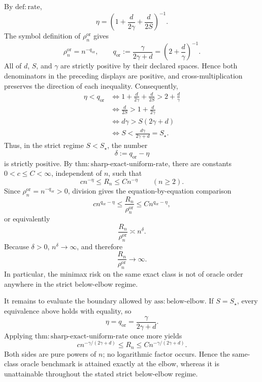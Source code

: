 By \(\mathrm{def:rate}\),
\[
\eta=\left(1+\frac{d}{2\gamma}+\frac{d}{2S}\right)^{-1}.
\]
The symbol definition of \(\rho_n^{\mathrm{or}}\) gives
\[
\rho_n^{\mathrm{or}}=n^{-q_{\mathrm{or}}},
\qquad
q_{\mathrm{or}}:=\frac{\gamma}{2\gamma+d}
=\left(2+\frac{d}{\gamma}\right)^{-1}.
\]
All of \(d\), \(S\), and \(\gamma\) are strictly positive by their declared spaces.  Hence both denominators in the preceding displays are positive, and cross-multiplication preserves the direction of each inequality.  Consequently,
\[
\begin{aligned}
\eta<q_{\mathrm{or}}
&\iff
1+\frac{d}{2\gamma}+\frac{d}{2S}
>2+\frac{d}{\gamma}\\
&\iff
\frac{d}{2S}>1+\frac{d}{2\gamma}\\
&\iff
d\gamma>S(2\gamma+d)\\
&\iff
S<\frac{d\gamma}{2\gamma+d}=S_{\star}.
\end{aligned}
\]
Thus, in the strict regime \(S<S_{\star}\), the number
\[
\delta:=q_{\mathrm{or}}-\eta
\]
is strictly positive.  By \(\mathrm{thm:sharp\mbox{-}exact\mbox{-}uniform\mbox{-}rate}\), there are constants \(0<c\le C<\infty\), independent of \(n\), such that
\[
c n^{-\eta}\le R_n\le C n^{-\eta}
\qquad(n\ge2).
\]
Since \(\rho_n^{\mathrm{or}}=n^{-q_{\mathrm{or}}}>0\), division gives the equation-by-equation comparison
\[
c n^{q_{\mathrm{or}}-\eta}
\le \frac{R_n}{\rho_n^{\mathrm{or}}}
\le C n^{q_{\mathrm{or}}-\eta},
\]
or equivalently
\[
\frac{R_n}{\rho_n^{\mathrm{or}}}\asymp n^{\delta}.
\]
Because \(\delta>0\), \(n^{\delta}\to\infty\), and therefore
\[
\frac{R_n}{\rho_n^{\mathrm{or}}}\longrightarrow\infty.
\]
In particular, the minimax risk on the same exact class is not of oracle order anywhere in the strict below-elbow regime.

It remains to evaluate the boundary allowed by \(\mathrm{ass:below\mbox{-}elbow}\).  If \(S=S_{\star}\), every equivalence above holds with equality, so
\[
\eta=q_{\mathrm{or}}=\frac{\gamma}{2\gamma+d}.
\]
Applying \(\mathrm{thm:sharp\mbox{-}exact\mbox{-}uniform\mbox{-}rate}\) once more yields
\[
c n^{-\gamma/(2\gamma+d)}
\le R_n\le
C n^{-\gamma/(2\gamma+d)}.
\]
Both sides are pure powers of \(n\); no logarithmic factor occurs.  Hence the same-class oracle benchmark is attained exactly at the elbow, whereas it is unattainable throughout the stated strict below-elbow regime.

